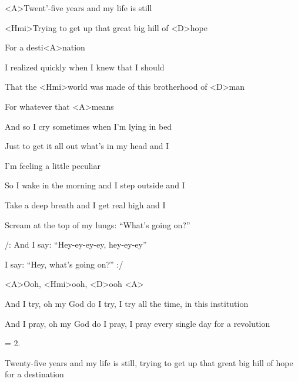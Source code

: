 
\zs
<A>Twent'-five years and my life is still

<Hmi>Trying to get up that great big hill of <D>hope

For a desti<A>nation

I realized quickly when I knew that I should

That the <Hmi>world was made of this brotherhood of <D>man

For whatever that <A>means
\ks

\zs
And so I cry sometimes when I'm lying in bed

Just to get it all out what's in my head and I

I'm feeling a little peculiar

So I wake in the morning and I step outside and I

Take a deep breath and I get real high and I

Scream at the top of my lungs: ``What's going on?''
\ks

\zr
/: And I say: ``Hey-ey-ey-ey, hey-ey-ey''

I say: ``Hey, what's going on?'' :/
\kr

<A>Ooh, <Hmi>ooh, <D>ooh <A>

\zs
And I try, oh my God do I try, I try all the time, in this institution

And I pray, oh my God do I pray, I pray every single day for a revolution
\ks

\zs 
= 2.
\ks

\zr
\kr

\zs
Twenty-five years and my life is still, trying to get up that great big hill 
of hope for a destination
\ks

\kp
